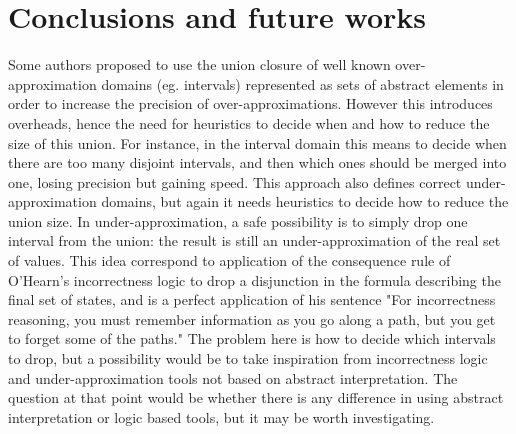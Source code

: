 \chapter{Conclusions and future works}

Some authors proposed  to use the union closure of well known over-approximation domains (eg. intervals) represented as sets of abstract elements in order to increase the precision of over-approximations. However this introduces overheads, hence the need for heuristics to decide when and how to reduce the size of this union. For instance, in the interval domain this means to decide when there are too many disjoint intervals, and then which ones should be merged into one, losing precision but gaining speed.
This approach also defines correct under-approximation domains, but again it needs heuristics to decide how to reduce the union size. In under-approximation, a safe possibility is to simply drop one interval from the union: the result is still an under-approximation of the real set of values. This idea correspond to application of the consequence rule of O'Hearn's incorrectness logic to drop a disjunction in the formula describing the final set of states, and is a perfect application of his sentence "For incorrectness reasoning, you must remember information as you go along a path, but you get to forget some of the paths."
The problem here is how to decide which intervals to drop, but a possibility would be to take inspiration from incorrectness logic and under-approximation tools not based on abstract interpretation. The question at that point would be whether there is any difference in using abstract interpretation or logic based tools, but it may be worth investigating.
